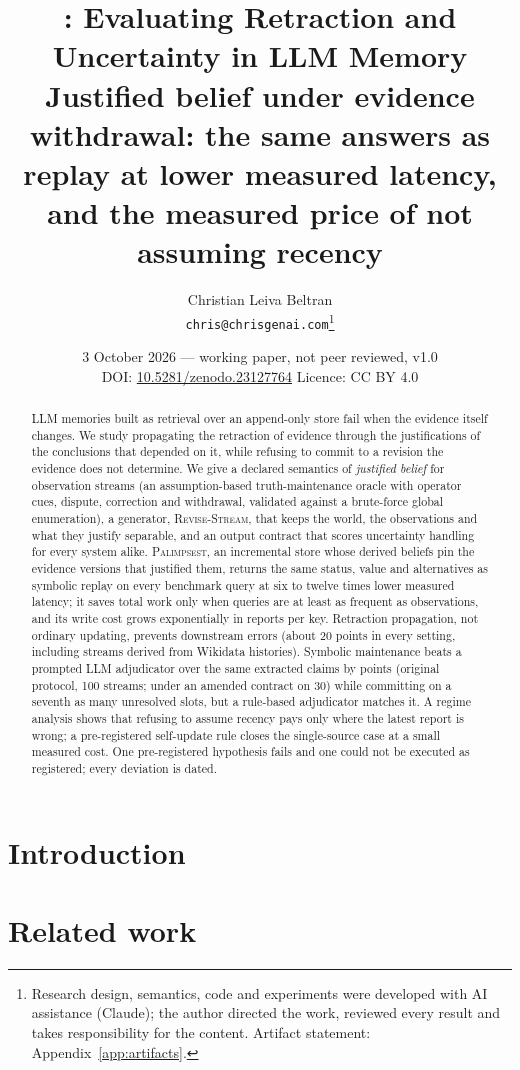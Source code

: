 \documentclass[11pt]{article}
\title{\pal: Evaluating Retraction and Uncertainty in LLM Memory\\
\large Justified belief under evidence withdrawal: the same answers as replay at lower measured latency, and the measured price of not assuming recency}
\author{Christian Leiva Beltran\\ \small \texttt{chris@chrisgenai.com}\thanks{Research design, semantics, code and experiments were developed with AI assistance (Claude); the author directed the work, reviewed every result and takes responsibility for the content. Artifact statement: Appendix~\ref{app:artifacts}.}}
\date{3 October 2026 --- working paper, not peer reviewed, v1.0 \\ \small DOI: \href{https://doi.org/10.5281/zenodo.23127764}{10.5281/zenodo.23127764} \quad Licence: CC BY 4.0}
\newcommand{\pal}{\textsc{Palimpsest}}
\newcommand{\rs}{\textsc{Revise-Stream}}
\begin{document}
\maketitle

\begin{abstract}
LLM memories built as retrieval over an append-only store fail when the evidence itself changes. We study propagating the retraction of evidence through the justifications of the conclusions that depended on it, while refusing to commit to a revision the evidence does not determine. We give a declared semantics of \emph{justified belief} for observation streams (an assumption-based truth-maintenance oracle with operator cues, dispute, correction and withdrawal, validated against a brute-force global enumeration), a generator, \rs, that keeps the world, the observations and what they justify separable, and an output contract that scores uncertainty handling for every system alike. \pal, an incremental store whose derived beliefs pin the evidence versions that justified them, returns the same status, value and alternatives as symbolic replay on every benchmark query at six to twelve times lower measured latency; it saves total work only when queries are at least as frequent as observations, and its write cost grows exponentially in reports per key. Retraction propagation, not ordinary updating, prevents downstream errors (about 20 points in every setting, including streams derived from Wikidata histories). Symbolic maintenance beats a prompted LLM adjudicator over the same extracted claims by \sTwoHOne{} points (original protocol, 100 streams; \sTwoCtwoLogDiff{} under an amended contract on 30) while committing on a seventh as many unresolved slots, but a rule-based adjudicator matches it. A regime analysis shows that refusing to assume recency pays only where the latest report is wrong; a pre-registered self-update rule closes the single-source case at a small measured cost. One pre-registered hypothesis fails and one could not be executed as registered; every deviation is dated.
\end{abstract}

\section{Introduction}


\section{Related work}
\end{document}
